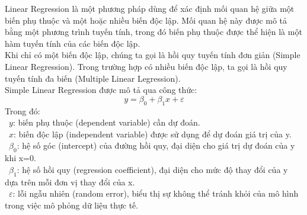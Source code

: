 Linear Regression là một phương pháp dùng để xác định mối quan hệ giữa một biến phụ thuộc và một hoặc nhiều biến độc lập. Mối quan hệ này được mô tả bằng một phương trình tuyến tính, trong đó biến phụ thuộc được thể hiện là một hàm tuyến tính của các biến độc lập.\\
Khi chỉ có một biến độc lập, chúng ta gọi là hồi quy tuyến tính đơn giản (Simple Linear Regression). Trong trường hợp có nhiều biến độc lập, ta gọi là hồi quy tuyến tính đa biến (Multiple Linear Legression).\\
Simple Linear Regression được mô tả qua công thức:\\
\[
y=\beta_{0}+\beta_{1}x+\varepsilon
\]
Trong đó:\\
\indent\textbullet\ \(y\): biến phụ thuộc (dependent variable) cần dự đoán.\\
\indent\textbullet\ \(x\): biến độc lập (independent variable) được sử dụng để dự đoán giá trị của y.\\
\indent\textbullet\ \(\beta_{0}\): hệ số góc (intercept) của đường hồi quy, đại diện cho giá trị dự đoán của y khi x=0.\\
\indent\textbullet\ \(\beta_{1}\): hệ số hồi quy (regression coefficient), đại diện cho mức độ thay đổi của y dựa trên mỗi đơn vị thay đổi của x.\\
\indent\textbullet\ \(\varepsilon\): lỗi ngẫu nhiên (random error), biểu thị sự không thể tránh khỏi của mô hình trong việc mô phỏng dữ liệu thực tế.